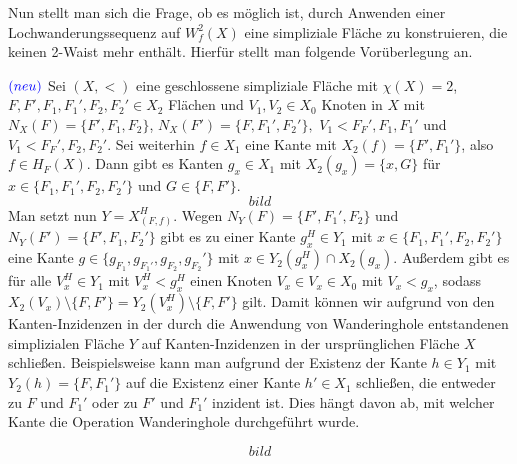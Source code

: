 \documentclass[12pt,titlepage]{article}
\begin{document}
 Nun stellt man sich die Frage, ob es möglich ist, durch Anwenden einer Lochwanderungssequenz auf $W^2_f(X)$ eine simpliziale Fläche zu konstruieren, die keinen 2-Waist mehr enthält. Hierfür stellt man folgende Vorüberlegung an.
 \begin{vor}\label{vor} $\textcolor{blue}{(neu)}$
 Sei $(X,<)$ eine geschlossene simpliziale Fläche mit $\chi(X)=2$, $F,F',F_1,F_1',F_2,F_2'\in X_2$ Flächen und $V_1,V_2\in X_0$ Knoten in $X$ mit 
$N_{X}(F)=\{F',F_1,F_2\} $, $N_{X}(F')=\{F,F_1',F_2'\},$
 $ V_1 < F_F',F_1,F_1'$ und $V_1 < F_F',F_2,F_2'$.  Sei weiterhin $f\in X_1$ eine Kante mit $X_2(f)=\{F',F_1'\}$, also $f \in H_F(X)$.
 Dann gibt es Kanten $g_x \in X_1$ mit $ X_2(g_x) =\{x,G\}$ für $x \in \{F_1,F_1',F_2,F_2'\}$ und $G\in \{F,F'\}$.
 \[
bild 
 \] 
Man setzt nun $Y=X_{(F,f)}^H$. Wegen $N_Y(F)=\{F',F_1',F_2\}$ und $N_Y(F')=\{F',F_1,F_2'\}$ gibt es zu einer Kante $g^H_x\in Y_1$ mit $x \in \{F_1,F_1',F_2,F_2'\}$ eine Kante $g \in \{g_{F_1},g_{F_1'},g_{F_2},g_{F_2}'\}$ mit $x \in Y_2(g_x^H) \cap X_2(g_x)$. Außerdem gibt es für alle $V_x^H\in Y_1$ mit $V_x^H<g_x^H$ einen Knoten $V_x \in V_x \in X_0$ mit $V_x<g_x$, sodass $ X_2(V_x)\setminus \{F,F'\}=Y_2(V^H_x)\setminus \{F,F'\}$ gilt.
 Damit können wir aufgrund von den Kanten-Inzidenzen in der durch die Anwendung von Wanderinghole entstandenen simplizialen Fläche $Y$ auf Kanten-Inzidenzen in der ursprünglichen Fläche $X$ schließen. Beispielsweise kann man aufgrund der Existenz der Kante $h \in Y_1$ mit $Y_2(h)=\{F,F_1'\}$  auf die Existenz einer Kante $h' \in  X_1$ schließen, die entweder zu $F$ und $F_1'$ oder zu $F'$  und $F_1'$ inzident ist. Dies hängt davon ab, mit welcher Kante die Operation Wanderinghole durchgeführt wurde. 
 
 \[
bild 
 \]
 \end{vor}
\end{document}
